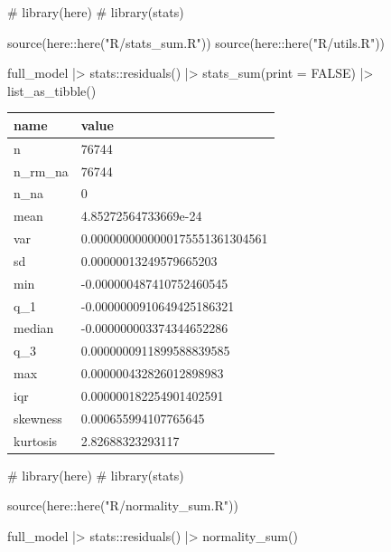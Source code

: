 \documentclass[
  12pt,
  a4paper,
  oneside]{tesesusp}
\newenvironment{Shaded}{\begin{snugshade}}{\end{snugshade}}
\newcommand{\AttributeTok}[1]{\textcolor[rgb]{0.40,0.45,0.13}{#1}}
\newcommand{\CommentTok}[1]{\textcolor[rgb]{0.37,0.37,0.37}{#1}}
\newcommand{\ConstantTok}[1]{\textcolor[rgb]{0.56,0.35,0.01}{#1}}
\newcommand{\FunctionTok}[1]{\textcolor[rgb]{0.28,0.35,0.67}{#1}}
\newcommand{\NormalTok}[1]{\textcolor[rgb]{0.00,0.23,0.31}{#1}}
\newcommand{\SpecialCharTok}[1]{\textcolor[rgb]{0.37,0.37,0.37}{#1}}
\newcommand{\StringTok}[1]{\textcolor[rgb]{0.13,0.47,0.30}{#1}}
\begin{document}
\begin{Shaded}
\begin{Highlighting}[numbers=left,,]
\CommentTok{\# library(here)}
\CommentTok{\# library(stats)}

\FunctionTok{source}\NormalTok{(here}\SpecialCharTok{::}\FunctionTok{here}\NormalTok{(}\StringTok{"R/stats\_sum.R"}\NormalTok{))}
\FunctionTok{source}\NormalTok{(here}\SpecialCharTok{::}\FunctionTok{here}\NormalTok{(}\StringTok{"R/utils.R"}\NormalTok{))}

\NormalTok{full\_model }\SpecialCharTok{|\textgreater{}}
\NormalTok{  stats}\SpecialCharTok{::}\FunctionTok{residuals}\NormalTok{() }\SpecialCharTok{|\textgreater{}}
  \FunctionTok{stats\_sum}\NormalTok{(}\AttributeTok{print =} \ConstantTok{FALSE}\NormalTok{) }\SpecialCharTok{|\textgreater{}} 
  \FunctionTok{list\_as\_tibble}\NormalTok{()}
\end{Highlighting}
\end{Shaded}

\begin{table}
\centering
\begin{tabular}{l|l}
\hline
name & value\\
\hline
n & 76744\\
\hline
n\_rm\_na & 76744\\
\hline
n\_na & 0\\
\hline
mean & 4.85272564733669e-24\\
\hline
var & 0.0000000000000175551361304561\\
\hline
sd & 0.00000013249579665203\\
\hline
min & -0.000000487410752460545\\
\hline
q\_1 & -0.0000000910649425186321\\
\hline
median & -0.000000003374344652286\\
\hline
q\_3 & 0.0000000911899588839585\\
\hline
max & 0.000000432826012898983\\
\hline
iqr & 0.000000182254901402591\\
\hline
skewness & 0.000655994107765645\\
\hline
kurtosis & 2.82688323293117\\
\hline
\end{tabular}
\end{table}

\begin{Shaded}
\begin{Highlighting}[numbers=left,,]
\CommentTok{\# library(here)}
\CommentTok{\# library(stats)}

\FunctionTok{source}\NormalTok{(here}\SpecialCharTok{::}\FunctionTok{here}\NormalTok{(}\StringTok{"R/normality\_sum.R"}\NormalTok{))}

\NormalTok{full\_model }\SpecialCharTok{|\textgreater{}}
\NormalTok{  stats}\SpecialCharTok{::}\FunctionTok{residuals}\NormalTok{() }\SpecialCharTok{|\textgreater{}}
  \FunctionTok{normality\_sum}\NormalTok{()}
\end{Highlighting}
\end{Shaded}
\end{document}
